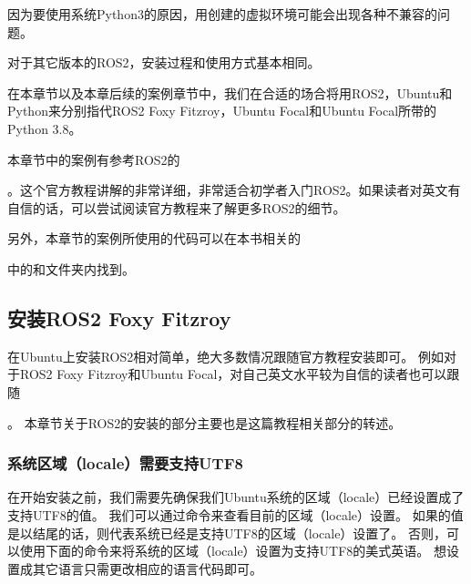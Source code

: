 \documentclass[letterpaper,10pt,english]{sphinxmanual}
\begin{document}
\sphinxAtStartPar
因为要使用系统Python3的原因，用创建的虚拟环境可能会出现各种不兼容的问题。

\sphinxAtStartPar
对于其它版本的ROS2，安装过程和使用方式基本相同。

\sphinxAtStartPar
在本章节以及本章后续的案例章节中，我们在合适的场合将用ROS2，Ubuntu和Python来分别指代ROS2
Foxy Fitzroy，Ubuntu Focal和Ubuntu Focal所带的Python 3.8。

\sphinxAtStartPar
本章节中的案例有参考ROS2的%
\begin{footnote}[90]\sphinxAtStartFootnote
{}
%
\end{footnote}。这个官方教程讲解的非常详细，非常适合初学者入门ROS2。如果读者对英文有自信的话，可以尝试阅读官方教程来了解更多ROS2的细节。

\sphinxAtStartPar
另外，本章节的案例所使用的代码可以在本书相关的%
\begin{footnote}[91]\sphinxAtStartFootnote
{}
%
\end{footnote}中的和文件夹内找到。


\subsection{安装ROS2 Foxy Fitzroy}
\label{\detokenize{chapter_rl_sys/ros_code_ex:ros2-foxy-fitzroy}}
\sphinxAtStartPar
在Ubuntu上安装ROS2相对简单，绝大多数情况跟随官方教程安装即可。
例如对于ROS2 Foxy Fitzroy和Ubuntu
Focal，对自己英文水平较为自信的读者也可以跟随%
\begin{footnote}[92]\sphinxAtStartFootnote
{}
%
\end{footnote}。
本章节关于ROS2的安装的部分主要也是这篇教程相关部分的转述。


\subsubsection{系统区域（locale）需要支持UTF\sphinxhyphen{}8}
\label{\detokenize{chapter_rl_sys/ros_code_ex:locale-utf-8}}
\sphinxAtStartPar
在开始安装之前，我们需要先确保我们Ubuntu系统的区域（locale）已经设置成了支持UTF\sphinxhyphen{}8的值。
我们可以通过命令来查看目前的区域（locale）设置。
如果的值是以结尾的话，则代表系统已经是支持UTF\sphinxhyphen{}8的区域（locale）设置了。
否则，可以使用下面的命令来将系统的区域（locale）设置为支持UTF\sphinxhyphen{}8的美式英语。
想设置成其它语言只需更改相应的语言代码即可。
\end{document}
